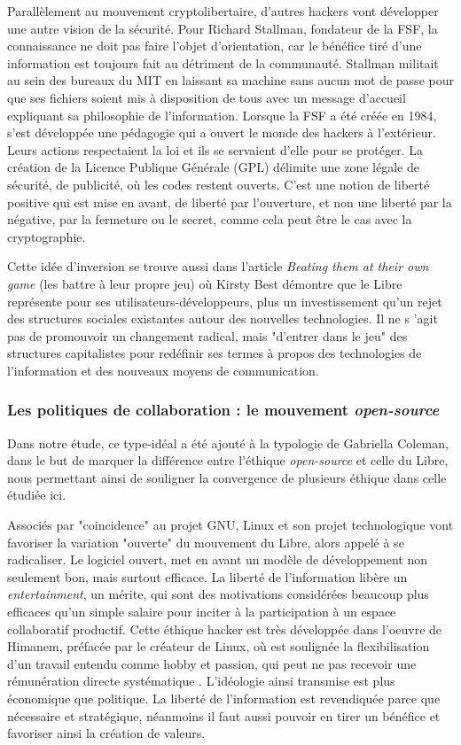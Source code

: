 Parallèlement au mouvement cryptolibertaire, d'autres hackers vont développer une autre vision de la sécurité. Pour Richard Stallman, fondateur de la FSF, la connaissance ne doit pas faire l'objet d'orientation, car le bénéfice tiré d'une information est toujours fait au détriment de la communauté. Stallman militait au sein des bureaux du MIT en laissant sa machine sans aucun mot de passe pour que ses fichiers soient mis à disposition de tous avec un message d'accueil expliquant sa philosophie de l'information. Lorsque la FSF a été créée en 1984, s'est développée une pédagogie qui a ouvert le monde des hackers à l'extérieur. Leurs actions respectaient la loi et ils se servaient d'elle pour se protéger. La création de la Licence Publique Générale (GPL) délimite une zone légale de sécurité, de publicité, où les codes restent ouverts. C'est une notion de liberté positive qui est mise en avant, de liberté par l'ouverture, et non une liberté par la négative, par la fermeture ou le secret, comme cela peut être le cas avec la cryptographie.

Cette idée d'inversion se trouve aussi dans l'article \emph{Beating them at their own game} (les battre à leur propre jeu) \citep{Best2003a} où Kirsty Best démontre que le Libre représente pour ses utilisateurs-développeurs, plus un investissement qu'un rejet des structures sociales existantes autour des nouvelles technologies. Il ne s 'agit pas de promouvoir un changement radical, mais "d'entrer dans le jeu" des structures capitalistes pour redéfinir ses termes à propos des technologies de l'information et des nouveaux moyens de communication.

\subsubsection{Les politiques de collaboration : le mouvement \emph{open-source}}
\label{2.2.2.d}

Dans notre étude, ce type-idéal a été ajouté à la typologie de Gabriella Coleman, dans le but de marquer la différence entre l'éthique \emph{open-source} et celle du Libre, nous permettant ainsi de souligner la convergence de plusieurs éthique dans celle étudiée ici.

Associés par "coincidence" \citep{Torvalds+Diamonds2001} au projet GNU, Linux et son projet technologique vont favoriser la variation "ouverte" du mouvement du Libre, alors appelé à se radicaliser. Le logiciel ouvert, met en avant un modèle de développement non seulement bon, mais surtout efficace. La liberté de l'information libère un \emph{entertainment}, un mérite, qui sont des motivations considérées beaucoup plus efficaces qu'un simple salaire pour inciter à la participation à un espace collaboratif productif. Cette éthique hacker est très développée dans l'oeuvre de Himanem, préfacée par le créateur de Linux, où est soulignée la flexibilisation d'un travail entendu comme hobby et passion, qui peut ne pas recevoir une rémunération directe systématique \citep{Himanem2001}. L'idéologie ainsi transmise est plus économique que politique. La liberté de l'information est revendiquée parce que nécessaire et stratégique, néanmoins il faut aussi pouvoir en tirer un bénéfice et favoriser ainsi la création de valeurs.

